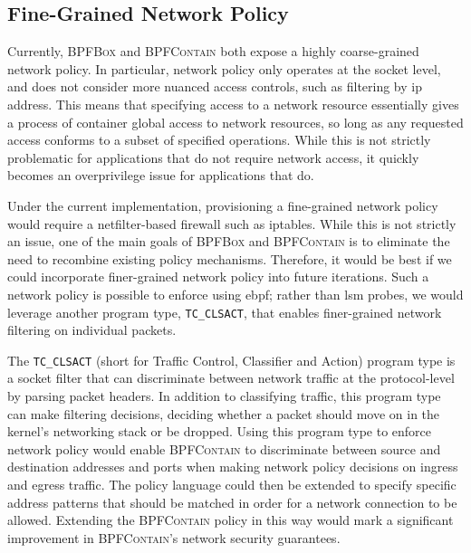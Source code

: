 \documentclass[
  fontsize=12pt,
  titlepage=firstiscover,
  paper=letter,
oneside,
  cleardoublepage=plain,
  parskip=half-,
  DIV=10,
  parindent,
  appendixprefix,
  chapterprefix,
  listof=totoc,
]{scrbook}
\newcommand{\bpfbox}{\textsc{BPFBox}}
\newcommand{\bpfcontain}{\textsc{BPFContain}}
\begin{document}
\subsection{Fine-Grained Network Policy}\label{ss:disc-fine-grained-network}

Currently, \bpfbox{} and \bpfcontain{} both expose a highly coarse-grained network policy.
In particular, network policy only operates at the socket level, and does not
consider more nuanced access controls, such as filtering by \gls{ip} address. This means
that specifying access to a network resource essentially gives a process of container
global access to network resources, so long as any requested access conforms to a subset
of specified operations. While this is not strictly problematic for applications that do
not require network access, it quickly becomes an overprivilege issue for applications
that do.

Under the current implementation, provisioning a fine-grained network policy would require
a netfilter-based firewall such as iptables. While this is not strictly an issue, one of
the main goals of \bpfbox{} and \bpfcontain{} is to eliminate the need to recombine
existing policy mechanisms. Therefore, it would be best if we could incorporate
finer-grained network policy into future iterations. Such a network policy is possible to
enforce using \gls{ebpf}; rather than \gls{lsm} probes, we would leverage another program
type, \texttt{TC\_CLSACT}, that enables finer-grained network filtering on individual packets.

The \texttt{TC\_CLSACT} (short for Traffic Control, Classifier and Action) program type is
a socket filter that can discriminate between network traffic at the protocol-level by
parsing packet headers. In addition to classifying traffic, this program type can make
filtering decisions, deciding whether a packet should move on in the kernel's networking
stack or be dropped. Using this program type to enforce network policy would enable
\bpfcontain{} to discriminate between source and destination addresses and ports when
making network policy decisions on ingress and egress traffic. The policy language could
then be extended to specify specific address patterns that should be matched in order for
a network connection to be allowed. Extending the \bpfcontain{} policy in this way would
mark a significant improvement in \bpfcontain{}'s network security guarantees.
\end{document}
